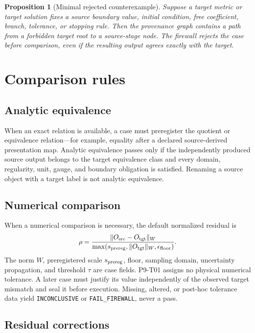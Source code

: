 \documentclass[11pt]{article}
\newtheorem{proposition}{Proposition}
\begin{document}
\begin{proposition}[Minimal rejected counterexample]
Suppose a target metric or target solution fixes a source boundary value,
initial condition, free coefficient, branch, tolerance, or stopping rule.
Then the provenance graph contains a path from a forbidden target root to a
source-stage node.  The firewall rejects the case before comparison, even if
the resulting output agrees exactly with the target.
\end{proposition}

\section{Comparison rules}

\subsection{Analytic equivalence}

When an exact relation is available, a case must preregister the quotient or
equivalence relation---for example, equality after a declared source-derived
presentation map.  Analytic equivalence passes only if the independently
produced source output belongs to the target equivalence class and every
domain, regularity, unit, gauge, and boundary obligation is satisfied.
Renaming a source object with a target label is not analytic equivalence.

\subsection{Numerical comparison}

When a numerical comparison is necessary, the default normalized residual is
\[
 \rho =
 \frac{\|O_{\rm src}-O_{\rm tgt}\|_W}
 {\max(s_{\rm prereg},\|O_{\rm tgt}\|_W,\epsilon_{\rm floor})}.
\]
The norm \(W\), preregistered scale \(s_{\rm prereg}\), floor,
sampling domain, uncertainty propagation, and threshold \(\tau\) are case
fields.  P9-T01 assigns no physical numerical tolerance.  A later case must
justify its value independently of the observed target mismatch and seal it
before execution.  Missing, altered, or post-hoc tolerance data yield
\texttt{INCONCLUSIVE} or \texttt{FAIL\_FIREWALL}, never a pass.

\subsection{Residual corrections}
\end{document}
